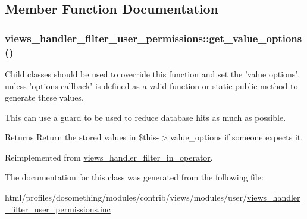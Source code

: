 \subsection{Member Function Documentation}
\hypertarget{classviews__handler__filter__user__permissions_a29db286bd8769cd996e3c5f2a02b0f36}{
\subsubsection[{get\_\-value\_\-options}]{\setlength{\rightskip}{0pt plus 5cm}views\_\-handler\_\-filter\_\-user\_\-permissions::get\_\-value\_\-options ()}}
\label{classviews__handler__filter__user__permissions_a29db286bd8769cd996e3c5f2a02b0f36}
Child classes should be used to override this function and set the 'value options', unless 'options callback' is defined as a valid function or static public method to generate these values.

This can use a guard to be used to reduce database hits as much as possible.

\begin{DoxyReturn}{Returns}
Return the stored values in \$this-\/$>$value\_\-options if someone expects it. 
\end{DoxyReturn}


Reimplemented from \hyperlink{classviews__handler__filter__in__operator_aa5b5df6d90f4359ed28c0c446bdc81a6}{views\_\-handler\_\-filter\_\-in\_\-operator}.

The documentation for this class was generated from the following file:\begin{DoxyCompactItemize}
\item 
html/profiles/dosomething/modules/contrib/views/modules/user/\hyperlink{views__handler__filter__user__permissions_8inc}{views\_\-handler\_\-filter\_\-user\_\-permissions.inc}\end{DoxyCompactItemize}
